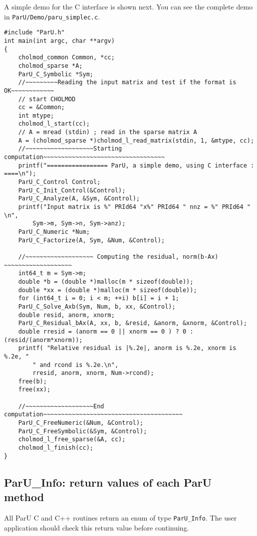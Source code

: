 \documentclass[12pt]{article}
\begin{document}
A simple demo for the C interface is shown next. You can see the complete demo
in \verb'ParU/Demo/paru_simplec.c'.

\begin{verbatim}
#include "ParU.h"
int main(int argc, char **argv)
{
    cholmod_common Common, *cc;
    cholmod_sparse *A;
    ParU_C_Symbolic *Sym;
    //~~~~~~~~~Reading the input matrix and test if the format is OK~~~~~~~~~~~~
    // start CHOLMOD
    cc = &Common;
    int mtype;
    cholmod_l_start(cc);
    // A = mread (stdin) ; read in the sparse matrix A
    A = (cholmod_sparse *)cholmod_l_read_matrix(stdin, 1, &mtype, cc);
    //~~~~~~~~~~~~~~~~~~~Starting computation~~~~~~~~~~~~~~~~~~~~~~~~~~~~~~~~~~
    printf("================= ParU, a simple demo, using C interface : ====\n");
    ParU_C_Control Control;
    ParU_C_Init_Control(&Control);
    ParU_C_Analyze(A, &Sym, &Control);
    printf("Input matrix is %" PRId64 "x%" PRId64 " nnz = %" PRId64 " \n",
        Sym->m, Sym->n, Sym->anz);
    ParU_C_Numeric *Num;
    ParU_C_Factorize(A, Sym, &Num, &Control);

    //~~~~~~~~~~~~~~~~~~~ Computing the residual, norm(b-Ax) ~~~~~~~~~~~~~~~~~~~
    int64_t m = Sym->m;
    double *b = (double *)malloc(m * sizeof(double));
    double *xx = (double *)malloc(m * sizeof(double));
    for (int64_t i = 0; i < m; ++i) b[i] = i + 1;
    ParU_C_Solve_Axb(Sym, Num, b, xx, &Control);
    double resid, anorm, xnorm;
    ParU_C_Residual_bAx(A, xx, b, &resid, &anorm, &xnorm, &Control);
    double rresid = (anorm == 0 || xnorm == 0 ) ? 0 : (resid/(anorm*xnorm));
    printf( "Relative residual is |%.2e|, anorm is %.2e, xnorm is %.2e, "
        " and rcond is %.2e.\n",
        rresid, anorm, xnorm, Num->rcond);
    free(b);
    free(xx);

    //~~~~~~~~~~~~~~~~~~~End computation~~~~~~~~~~~~~~~~~~~~~~~~~~~~~~~~~~~~~~~
    ParU_C_FreeNumeric(&Num, &Control);
    ParU_C_FreeSymbolic(&Sym, &Control);
    cholmod_l_free_sparse(&A, cc);
    cholmod_l_finish(cc);
}
\end{verbatim}

\subsection{{\sf ParU\_Info}: return values of each ParU method}

    All ParU C and C++ routines return an enum of type \verb'ParU_Info'.  The
    user application should check this return value before continuing.
\end{document}
